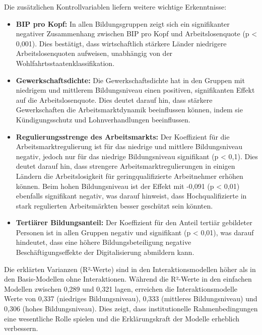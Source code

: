 Die zusätzlichen Kontrollvariablen liefern weitere wichtige Erkenntnisse:

\begin{itemize}
    \item \textbf{BIP pro Kopf:} In allen Bildungsgruppen zeigt sich ein signifikanter negativer 
    Zusammenhang zwischen BIP pro Kopf und Arbeitslosenquote (p < 0,001). Dies bestätigt, dass 
    wirtschaftlich stärkere Länder niedrigere Arbeitslosenquoten aufweisen, unabhängig von der 
    Wohlfahrtsstaatenklassifikation.
    
    \item \textbf{Gewerkschaftsdichte:} Die Gewerkschaftsdichte hat in den Gruppen mit niedrigem und 
    mittlerem Bildungsniveau einen positiven, signifikanten Effekt auf die Arbeitslosenquote. Dies 
    deutet darauf hin, dass stärkere Gewerkschaften die Arbeitsmarktdynamik beeinflussen können, indem 
    sie Kündigungsschutz und Lohnverhandlungen beeinflussen.
    
    \item \textbf{Regulierungsstrenge des Arbeitsmarkts:} Der Koeffizient für die Arbeitsmarktregulierung 
    ist für das niedrige und mittlere Bildungsniveau negativ, jedoch nur für das niedrige Bildungsniveau 
    signifikant (p < 0,1). Dies deutet darauf hin, dass strengere Arbeitsmarktregulierungen in einigen 
    Ländern die Arbeitslosigkeit für geringqualifizierte Arbeitnehmer erhöhen können. Beim hohen 
    Bildungsniveau ist der Effekt mit -0,091 (p < 0,01) ebenfalls signifikant negativ, was darauf 
    hinweist, dass Hochqualifizierte in stark regulierten Arbeitsmärkten besser geschützt sein könnten.
    
    \item \textbf{Tertiärer Bildungsanteil:} Der Koeffizient für den Anteil tertiär gebildeter 
    Personen ist in allen Gruppen negativ und signifikant (p < 0,01), was darauf hindeutet, dass eine 
    höhere Bildungsbeteiligung negative Beschäftigungseffekte der Digitalisierung abmildern kann.
\end{itemize}

Die erklärten Varianzen (R²-Werte) sind in den Interaktionsmodellen höher als in 
den Basis-Modellen ohne Interaktionen. Während die R²-Werte in den einfachen Modellen 
zwischen 0,289 und 0,321 lagen, erreichen die Interaktionsmodelle Werte von 0,337 
(niedriges Bildungsniveau), 0,333 (mittleres Bildungsniveau) und 0,306 (hohes Bildungsniveau). 
Dies zeigt, dass institutionelle Rahmenbedingungen eine wesentliche Rolle spielen und die 
Erklärungskraft der Modelle erheblich verbessern.

